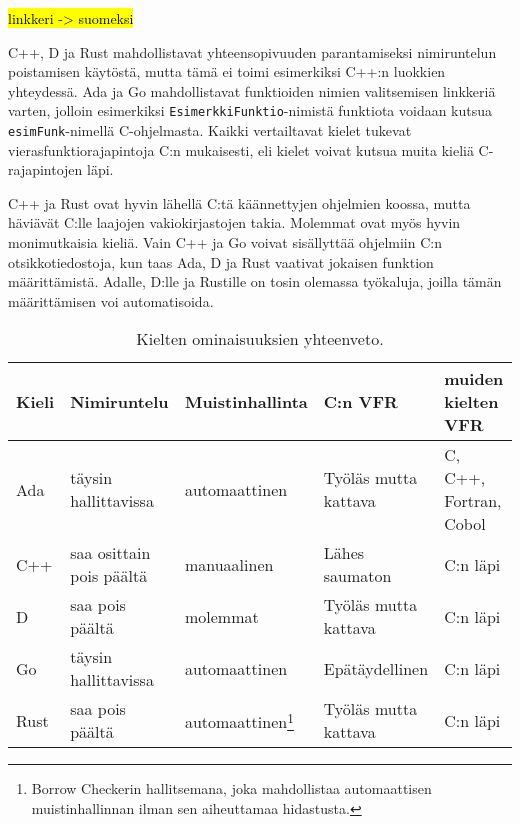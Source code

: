 \hl{linkkeri -> suomeksi}


C++, D ja Rust mahdollistavat yhteensopivuuden parantamiseksi nimiruntelun
poistamisen käytöstä, mutta tämä ei toimi esimerkiksi C++:n luokkien
yhteydessä. Ada ja Go mahdollistavat funktioiden nimien valitsemisen linkkeriä
varten, jolloin esimerkiksi \texttt{EsimerkkiFunktio}-nimistä funktiota voidaan
kutsua \texttt{esimFunk}-nimellä C-ohjelmasta. Kaikki vertailtavat kielet
tukevat vierasfunktiorajapintoja C:n mukaisesti, eli kielet voivat kutsua muita
kieliä C-rajapintojen läpi.

C++ ja Rust ovat hyvin lähellä C:tä käännettyjen ohjelmien koossa, mutta
häviävät C:lle laajojen vakiokirjastojen takia. Molemmat ovat myös hyvin
monimutkaisia kieliä. Vain C++ ja Go voivat sisällyttää ohjelmiin C:n
otsikkotiedostoja, kun taas Ada, D ja Rust vaativat jokaisen funktion
määrittämistä. Adalle, D:lle ja Rustille on tosin olemassa työkaluja, joilla
tämän määrittämisen voi automatisoida.

\begin{table}[ht!]
    \begin{adjustbox}{center}
    \kern -1cm
    \begin{tabular}{@{}lllll@{}} \toprule
        Kieli & Nimiruntelu   & Muistinhallinta                                     & C:n VFR               & muiden kielten VFR \\ \midrule
        Ada   & täysin hallittavissa & automaattinen                                       & Työläs mutta kattava  & C, C++, Fortran, Cobol \\
        C++   & saa osittain pois päältä      & manuaalinen                                         & Lähes saumaton        & C:n läpi \\
        D     & saa pois päältä      & molemmat                                            & Työläs mutta kattava  & C:n läpi \\
        Go    & täysin hallittavissa      & automaattinen                                       & Epätäydellinen        & C:n läpi \\
        Rust  & saa pois päältä & automaattinen\footnote{Borrow Checkerin hallitsemana, joka mahdollistaa automaattisen muistinhallinnan ilman sen aiheuttamaa hidastusta.} & Työläs mutta kattava  & C:n läpi \\ \bottomrule
    \end{tabular}
    \end{adjustbox}
    \caption{
        Kielten ominaisuuksien yhteenveto.
    }
    \label{table:properties}
\end{table}

